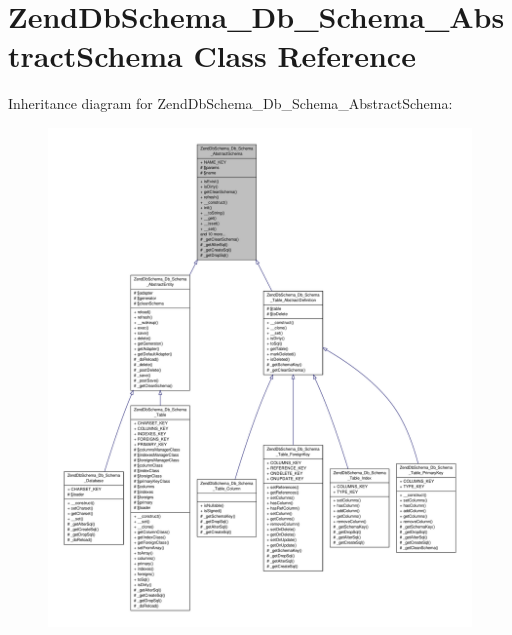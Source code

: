 \hypertarget{classZendDbSchema__Db__Schema__AbstractSchema}{\section{Zend\-Db\-Schema\-\_\-\-Db\-\_\-\-Schema\-\_\-\-Abstract\-Schema Class Reference}
\label{classZendDbSchema__Db__Schema__AbstractSchema}
}


Inheritance diagram for Zend\-Db\-Schema\-\_\-\-Db\-\_\-\-Schema\-\_\-\-Abstract\-Schema\-:\nopagebreak
\begin{figure}[H]
\begin{center}
\leavevmode
\includegraphics[width=350pt]{classZendDbSchema__Db__Schema__AbstractSchema__inherit__graph}
\end{center}
\end{figure}


